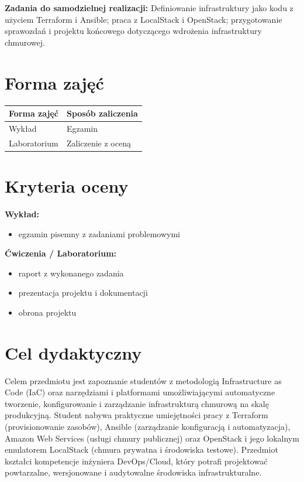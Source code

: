 \documentclass[12pt, a4paper]{article}
\newcommand{\thdrule}{\noalign{\global\setlength{\extrarowheight}{0pt}}}
\newcommand{\thdend}{\noalign{\global\setlength{\extrarowheight}{3pt}}}
\begin{document}
\vspace{4pt}
\noindent\textbf{Zadania do samodzielnej realizacji:} Definiowanie infrastruktury jako kodu z użyciem Terraform i Ansible; praca z LocalStack i OpenStack; przygotowanie sprawozdań i projektu końcowego dotyczącego wdrożenia infrastruktury chmurowej.

\section{Forma zajęć}

\begin{center}
{\scriptsize
\begin{tabular}{m{5cm}m{8cm}}
\thdrule\toprule
\rowcolor{pjatkRed} {\color{white}\textbf{Forma zajęć}} & {\color{white}\textbf{Sposób zaliczenia}} \\
\midrule\thdend
  \rowcolor{tableRowLight} Wykład & Egzamin \\
  \rowcolor{tableRowAlt} Laboratorium & Zaliczenie z oceną \\
\bottomrule
\end{tabular}}
\end{center}

\section{Kryteria oceny}

\textbf{Wykład:}
\begin{itemize}
  \item egzamin pisemny z zadaniami problemowymi
\end{itemize}
\vspace{4pt}
\textbf{Ćwiczenia / Laboratorium:}
\begin{itemize}
  \item raport z wykonanego zadania
  \item prezentacja projektu i dokumentacji
  \item obrona projektu
\end{itemize}


\section{Cel dydaktyczny}

Celem przedmiotu jest zapoznanie studentów z metodologią Infrastructure as Code (IaC) oraz narzędziami i platformami umożliwiającymi automatyczne tworzenie, konfigurowanie i zarządzanie infrastrukturą chmurową na skalę produkcyjną. Student nabywa praktyczne umiejętności pracy z Terraform (provisionowanie zasobów), Ansible (zarządzanie konfiguracją i automatyzacja), Amazon Web Services (usługi chmury publicznej) oraz OpenStack i jego lokalnym emulatorem LocalStack (chmura prywatna i środowiska testowe). Przedmiot kształci kompetencje inżyniera DevOps/Cloud, który potrafi projektować powtarzalne, wersjonowane i audytowalne środowiska infrastrukturalne.
\end{document}
